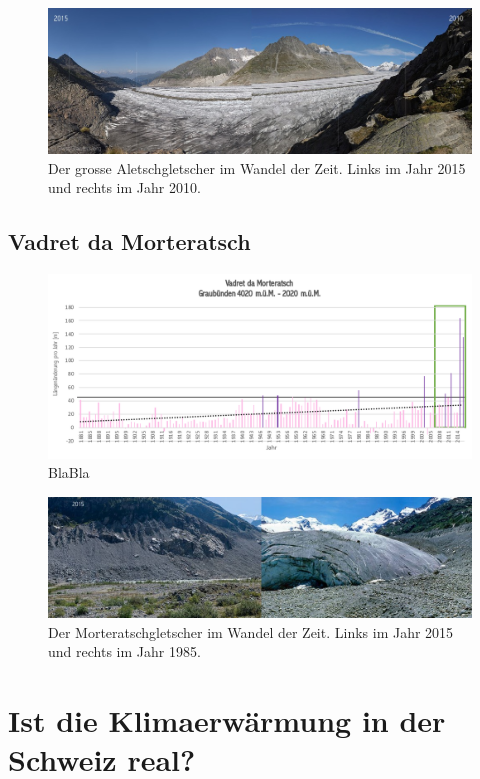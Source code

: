 \begin{refsection}
\begin{figure}[htbp]
\centering
\includegraphics[width=1.0\textwidth]{extrem/Aletsch.jpg}
\caption{Der grosse Aletschgletscher im Wandel der Zeit. Links im Jahr 2015 und rechts im Jahr 2010.}
\label{Aletsch}
\end{figure}

\subsection{Vadret da Morteratsch}



\begin{figure}[htbp]
\centering
\includegraphics[width=1.0\textwidth]{extrem/Morteratsch.pdf}
\caption{BlaBla}
\label{Morteratschtab}
\end{figure}


\begin{figure}[htbp]
\centering
\includegraphics[width=1.0\textwidth]{extrem/Morteratsch.jpg}
\caption{Der Morteratschgletscher im Wandel der Zeit. Links im Jahr 2015 und rechts im Jahr 1985.}
\label{Morteratsch}
\end{figure}



\section{Ist die Klimaerwärmung in der Schweiz real?}








\printbibliography[heading=subbibliography]
\end{refsection}

